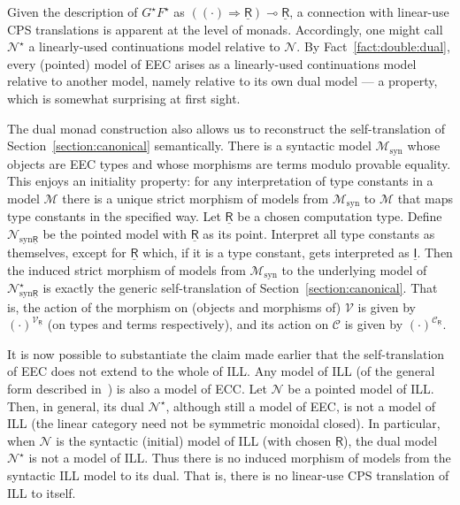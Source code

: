 \documentclass{LMCS}
\newcommand{\comptype}[1]{\underline{#1}}
\newcommand{\CR}{\comptype{\mathsf{R}}}
\newcommand{\CI}{\comptype{\mathsf{I}}}
\newcommand{\lpop}{\multimap}
\newcommand{\Cfun}{\Rightarrow}
\newcommand{\CpsVT}[1]{#1^{\mathcal{V}_{\CR}}}
\newcommand{\CpsCT}[1]{#1^{\mathcal{C}_{\CR}}}
\begin{document}
Given the description of $G^{\star}F^{\star}$ as $((\cdot) \Cfun \CR) \lpop \CR$,
a connection with linear-use CPS translations is apparent at the level 
of  monads. Accordingly, one might call $\mathcal{N}^{\star}$ a linearly-used continuations
model relative to $\mathcal{N}$. By Fact~\ref{fact:double:dual},
every (pointed) model of EEC arises as a linearly-used continuations model relative
to another model, namely relative to its own dual model --- a property, which is somewhat
surprising at first sight. 

The dual monad construction also allows us to reconstruct the 
self-translation of Section~\ref{section:canonical} semantically.
There is a syntactic model $\mathcal{M}_{\mathrm{syn}}$ 
whose objects are EEC types and whose morphisms are 
terms modulo provable equality. 
This enjoys an initiality property: for any interpretation
of type constants in a model $\mathcal{M}$  there is a unique
strict morphism of models from $\mathcal{M}_{\mathrm{syn}}$ to $\mathcal{M}$
that maps type constants in the specified way. 
Let $\CR$ be a chosen computation type.
Define $\mathcal{N}_{\mathrm{syn}\CR}$ be the pointed model with $\CR$ as 
its point.
Interpret
all type constants as themselves,  except for $\CR$ which, if it is a type constant,
gets interpreted as $\CI$. Then the induced strict morphism of  models
from $\mathcal{M}_{\mathrm{syn}}$ to the underlying model
of $\mathcal{N}_{\mathrm{syn}\CR}^{\star}$ is exactly the generic self-translation of 
Section~\ref{section:canonical}. That is, the action of the morphism 
on (objects and morphisms of) $\mathcal{V}$ is
given by $\CpsVT{(\cdot)}$ (on types and terms respectively), and its action on $\mathcal{C}$
is given by $\CpsCT{(\cdot)}$.

It is now possible to substantiate the claim made earlier that the 
self-translation of EEC does not extend to the whole of ILL.
Any model of ILL (of the general form described in~\cite{Benton:95}) 
is also a model of ECC. Let $\mathcal{N}$ be a pointed model of ILL.
Then, in general, its dual $\mathcal{N}^{\star}$, although still a model of EEC,
is not a model of ILL (the linear category need not be
symmetric monoidal closed). In particular, when $\mathcal{N}$ is the
syntactic (initial) model of ILL (with chosen $\CR$), the dual model
$\mathcal{N}^{\star}$ is not a model of ILL.  Thus there is no induced morphism of models
from the syntactic ILL model to its dual. That is, there is no linear-use CPS
translation of ILL to itself.
\end{document}
